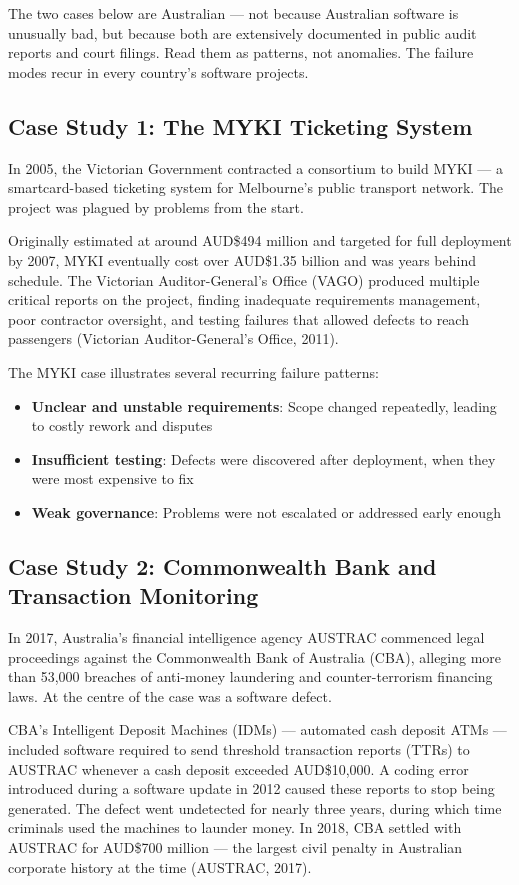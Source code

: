 \documentclass[11pt,a4paper]{book}
\begin{document}
The two cases below are Australian --- not because Australian software is unusually bad, but because both are extensively documented in public audit reports and court filings. Read them as patterns, not anomalies. The failure modes recur in every country's software projects.

\subsection{Case Study 1: The MYKI Ticketing System}

In 2005, the Victorian Government contracted a consortium to build MYKI --- a smartcard-based ticketing system for Melbourne's public transport network. The project was plagued by problems from the start.

Originally estimated at around AUD\$494 million and targeted for full deployment by 2007, MYKI eventually cost over AUD\$1.35 billion and was years behind schedule. The Victorian Auditor-General's Office (VAGO) produced multiple critical reports on the project, finding inadequate requirements management, poor contractor oversight, and testing failures that allowed defects to reach passengers (Victorian Auditor-General's Office, 2011).

The MYKI case illustrates several recurring failure patterns:

\begin{itemize}
  \item \textbf{Unclear and unstable requirements}: Scope changed repeatedly, leading to costly rework and disputes
  \item \textbf{Insufficient testing}: Defects were discovered after deployment, when they were most expensive to fix
  \item \textbf{Weak governance}: Problems were not escalated or addressed early enough
\end{itemize}

\subsection{Case Study 2: Commonwealth Bank and Transaction Monitoring}

In 2017, Australia's financial intelligence agency AUSTRAC commenced legal proceedings against the Commonwealth Bank of Australia (CBA), alleging more than 53,000 breaches of anti-money laundering and counter-terrorism financing laws. At the centre of the case was a software defect.

CBA's Intelligent Deposit Machines (IDMs) --- automated cash deposit ATMs --- included software required to send threshold transaction reports (TTRs) to AUSTRAC whenever a cash deposit exceeded AUD\$10,000. A coding error introduced during a software update in 2012 caused these reports to stop being generated. The defect went undetected for nearly three years, during which time criminals used the machines to launder money. In 2018, CBA settled with AUSTRAC for AUD\$700 million --- the largest civil penalty in Australian corporate history at the time (AUSTRAC, 2017).
\end{document}
